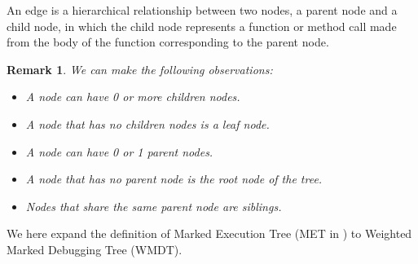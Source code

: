 \begin{definition}[Edge]
An edge is a hierarchical relationship between two nodes, a parent node and a child node, in which the child node represents a function or method call made from the body of the function corresponding to the parent node.
\end{definition}
\newtheorem{remark}{Remark}
\begin{remark}
We can make the following observations:
\begin{itemize}
    \item A node can have 0 or more children nodes.
    \item A node that has no children nodes is a leaf node.
    \item A node can have 0 or 1 parent nodes.
    \item A node that has no parent node is the root node of the tree.
    \item Nodes that share the same parent node are siblings.
\end{itemize}
\end{remark}
We here expand the definition of Marked Execution Tree (MET in \citep{optimal_strategy}) to Weighted Marked Debugging Tree (WMDT).
